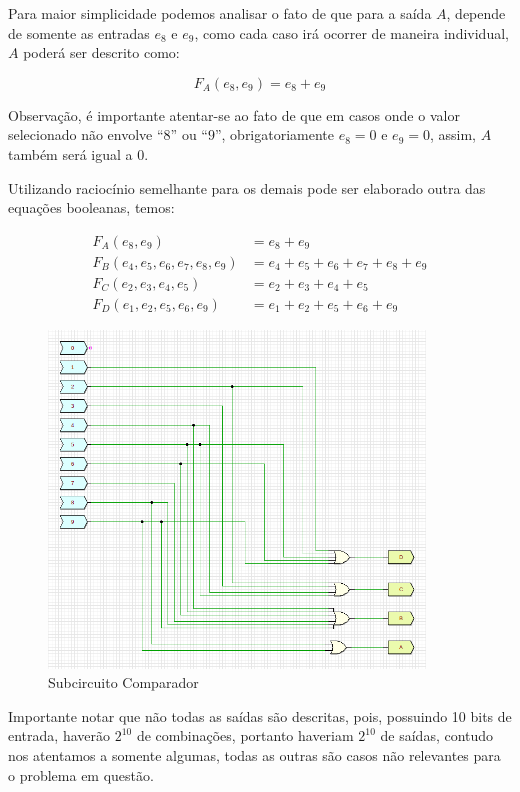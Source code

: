 \documentclass[12pt]{article}
\begin{document}
Para maior simplicidade podemos analisar o fato de que para a saída
\textbf{$A$}, depende de somente as entradas $e_{8}$ e $e_{9}$, como cada caso
irá ocorrer de maneira individual, \textbf{$A$} poderá ser descrito como:

\begin{equation}
F_{A}(e_{8}, e_{9}) = e_{8} + e_{9}
\end{equation}

Observação, é importante atentar-se ao fato de que em casos onde o valor
selecionado não envolve ``$8$'' ou ``$9$'', obrigatoriamente $e_{8}=0$ e $e_{9}=0$,
assim, \textbf{$A$} também será igual a $0$.

Utilizando raciocínio semelhante para os demais pode ser elaborado outra das
equações booleanas, temos:

\begin{align}
F_{A}(e_{8}, e_{9}) &= e_{8} + e_{9} \\
F_{B}(e_{4},e_{5},e_{6},e_{7},e_{8},e_{9}) &= e_{4}+e_{5}+e_{6}+e_{7}+e_{8}+e_{9} \\
F_{C}(e_{2},e_{3},e_{4},e_{5}) &= e_{2}+e_{3}+e_{4}+e_{5} \\
F_{D}(e_{1},e_{2},e_{5},e_{6},e_{9}) &= e_{1}+e_{2}+e_{5}+e_{6}+e_{9}
\end{align}

\begin{figure}[H]
    \centering
    \includegraphics[width=10cm]{Exp05/2.1.png}
    \caption{Subcircuito Comparador}
    \label{fig:subComparador2.1}
\end{figure}

Importante notar que não todas as saídas são descritas, pois, possuindo 10 bits
de entrada, haverão $2^{10}$ de combinações, portanto haveriam $2^{10}$ de
saídas, contudo nos atentamos a somente algumas, todas as outras são casos não
relevantes para o problema em questão.
\end{document}
